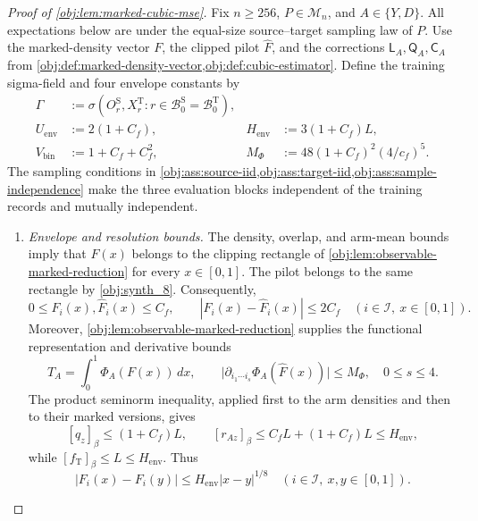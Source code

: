 \documentclass[11pt]{article}
\begin{document}
\begin{proof}[Proof of \cref{obj:lem:marked-cubic-mse}]
Fix \(n\ge256\), \(P\in\mathcal M_n\), and \(A\in\{Y,D\}\). All expectations below are under the equal-size source--target sampling law of \(P\). Use the marked-density vector \(F\), the clipped pilot \(\widehat F\), and the corrections \(\mathsf L_A,\mathsf Q_A,\mathsf C_A\) from \cref{obj:def:marked-density-vector,obj:def:cubic-estimator}. Define the training sigma-field and four envelope constants by
\[
\begin{aligned}
\Gamma
&:=\sigma\!\left(
O_r^{\mathrm S},X_r^{\mathrm T}:
r\in\mathcal B_0^{\mathrm S}
=\mathcal B_0^{\mathrm T}
\right),\\
U_{\mathrm{env}}&:=2(1+C_f),&
H_{\mathrm{env}}&:=3(1+C_f)L,\\
V_{\mathrm{bin}}&:=1+C_f+C_f^2,&
M_{\Phi}&:=48(1+C_f)^2(4/c_f)^5.
\end{aligned}
\]
The sampling conditions in
\cref{obj:ass:source-iid,obj:ass:target-iid,obj:ass:sample-independence}
make the three evaluation blocks independent of the training records and mutually independent.

\begin{enumerate}
\item \textit{Envelope and resolution bounds.}
The density, overlap, and arm-mean bounds imply that \(F(x)\) belongs to the clipping rectangle of \cref{obj:lem:observable-marked-reduction} for every \(x\in[0,1]\). The pilot belongs to the same rectangle by \cref{obj:synth_8}. Consequently,
\[
0\le F_i(x),\widehat F_i(x)\le C_f,
\qquad
|F_i(x)-\widehat F_i(x)|\le2C_f
\quad(i\in\mathcal I,\ x\in[0,1]).
\]
Moreover, \cref{obj:lem:observable-marked-reduction} supplies the functional representation and derivative bounds
\[
T_A=\int_0^1\Phi_A(F(x))\,dx,
\qquad
\bigl|\partial_{i_1\cdots i_s}\Phi_A(\widehat F(x))\bigr|
\le M_{\Phi},
\quad 0\le s\le4.
\]
The product seminorm inequality, applied first to the arm densities and then to their marked versions, gives
\[
[q_z]_\beta\le(1+C_f)L,\qquad
[r_{Az}]_\beta
\le C_fL+(1+C_f)L
\le H_{\mathrm{env}},
\]
while \([f_{\mathrm T}]_\beta\le L\le H_{\mathrm{env}}\). Thus
\[
|F_i(x)-F_i(y)|
\le H_{\mathrm{env}}|x-y|^{1/8}
\quad(i\in\mathcal I,\ x,y\in[0,1]).
\]


\end{enumerate}
\end{proof}
\end{document}
